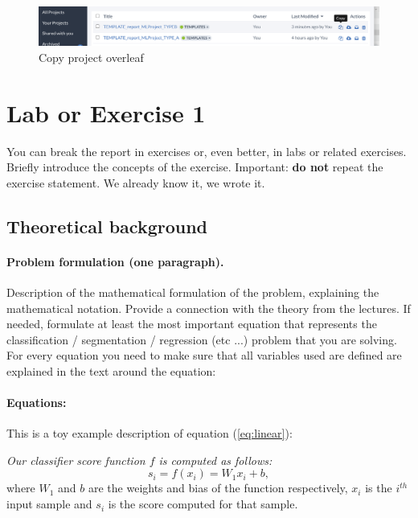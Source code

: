 \documentclass[twocolumn]{article}
\begin{document}
\begin{figure}[!htb]
\centering
\includegraphics[width=0.95\columnwidth]{images/copyproject.png}
\caption{Copy project overleaf}
\label{fig:copyproject}
\end{figure}
  
\section{Lab or Exercise 1}

You can break the report in exercises or, even better, in labs or related exercises. Briefly introduce the concepts of the exercise. Important: \textbf{do not} repeat the exercise statement. We already know it, we wrote it.


\subsection{Theoretical background}

\paragraph{Problem formulation (one paragraph).} 
Description of the mathematical formulation of the problem, explaining the mathematical notation. Provide a connection with the theory from the lectures. If needed, formulate at least the most important equation that represents the classification / segmentation / regression (etc ...) problem that you are solving. For every equation you need to make sure that all variables used are defined are explained in the text around the equation:

\paragraph{Equations:} This is a toy example description of equation (\ref{eq:linear}):

\textit{Our classifier score function $f$ is computed as follows:}
\begin{equation}
s_i = f(x_i) = W_1 x_i + b, \label{eq:linear}
\end{equation}
\noindent where $W_1$ and $b$ are the weights and bias of the function respectively, $x_i$ is the $i^{th}$ input sample and $s_i$ is the score computed for that sample.
\end{document}
